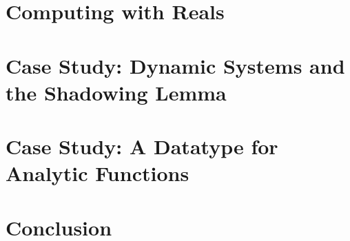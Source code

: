 \documentclass[tudarticle,type=msc,colorback,accentcolor=tud9c, twoside]{tudthesis}
\begin{document}
  \chapter{Computing with Reals}
  
  
  
  
  
  
  \chapter{Case Study: Dynamic Systems and the Shadowing Lemma}
  
  \chapter{Case Study: A Datatype for Analytic Functions}
  
  \chapter{Conclusion}
  
  
\end{document}
